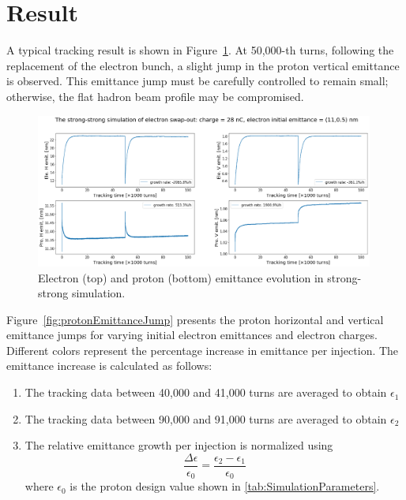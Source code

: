 \documentclass{article}
\begin{document}
\section{Result}
A typical tracking result is shown in Figure~\ref{fig:ssTrackingExample}.
At 50,000-th turns, following the replacement of the electron bunch, a slight jump 
in the proton vertical emittance is observed. This emittance jump must be 
carefully controlled to remain small; otherwise, the flat hadron beam profile 
may be compromised.
\begin{figure}
    \centering
    \includegraphics[width=0.99\textwidth]{pic/28nC_track/11_0.5.png}
    \caption{Electron (top) and proton (bottom) emittance evolution in strong-strong simulation.}
    \label{fig:ssTrackingExample}
\end{figure}

Figure~\ref{fig:protonEmittanceJump} presents the proton horizontal and vertical 
emittance jumps for varying initial electron emittances and electron charges. 
Different colors represent the percentage increase in emittance per injection.
The emittance increase is calculated as follows:
\begin{enumerate}[(1)]
    \item The tracking data between 40,000 and 41,000 turns are averaged to obtain $\epsilon_1$
    \item The tracking data between 90,000 and 91,000 turns are averaged to obtain $\epsilon_2$
    \item The relative emittance growth per injection is normalized using
    \begin{displaymath}
    \frac{\Delta \epsilon}{\epsilon_0}=\frac{\epsilon_2-\epsilon_1}{\epsilon_0}
    \end{displaymath}
    where $\epsilon_0$ is the proton design value shown in \ref{tab:SimulationParameters}.
\end{enumerate}
\end{document}

